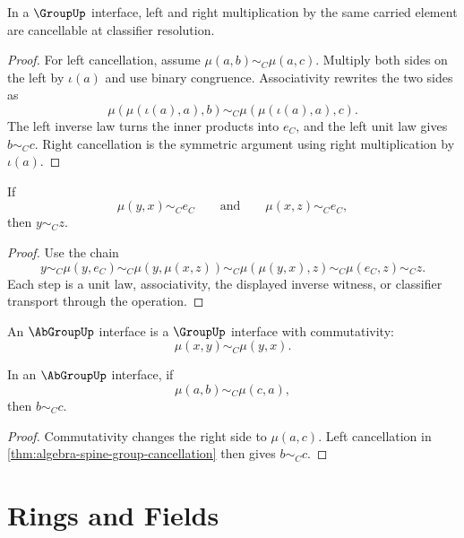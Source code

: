 \begin{theorem}
\label{thm:algebra-spine-group-cancellation}
In a $\GroupUp$ interface, left and right multiplication by the same carried
element are cancellable at classifier resolution.
\end{theorem}

\begin{proof}
For left cancellation, assume $\mu(a,b)\sim_C\mu(a,c)$.  Multiply both sides
on the left by $\iota(a)$ and use binary congruence.  Associativity rewrites
the two sides as
$$
\mu(\mu(\iota(a),a),b)
\sim_C
\mu(\mu(\iota(a),a),c).
$$
The left inverse law turns the inner products into $e_C$, and the left unit
law gives $b\sim_C c$.  Right cancellation is the symmetric argument using
right multiplication by $\iota(a)$.
\end{proof}

\begin{theorem}
\label{thm:algebra-spine-inverse-uniqueness}
If
$$
\mu(y,x)\sim_C e_C
\qquad\text{and}\qquad
\mu(x,z)\sim_C e_C,
$$
then $y\sim_C z$.
\end{theorem}

\begin{proof}
Use the chain
$$
y
\sim_C
\mu(y,e_C)
\sim_C
\mu(y,\mu(x,z))
\sim_C
\mu(\mu(y,x),z)
\sim_C
\mu(e_C,z)
\sim_C
z.
$$
Each step is a unit law, associativity, the displayed inverse witness, or
classifier transport through the operation.
\end{proof}

\begin{definition}
\label{def:algebra-spine-abgroup}
An $\AbGroupUp$ interface is a $\GroupUp$ interface with commutativity:
$$
\mu(x,y)\sim_C\mu(y,x).
$$
\end{definition}

\begin{theorem}
\label{thm:algebra-spine-balanced-cancellation}
In an $\AbGroupUp$ interface, if
$$
\mu(a,b)\sim_C\mu(c,a),
$$
then $b\sim_C c$.
\end{theorem}

\begin{proof}
Commutativity changes the right side to $\mu(a,c)$.  Left cancellation in
\autoref{thm:algebra-spine-group-cancellation} then gives $b\sim_C c$.
\end{proof}

\section{Rings and Fields}
\label{sec:algebra-spine-rings-fields}

